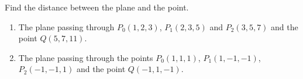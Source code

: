 Find the distance between the plane and the point.

\begin{enumerate}
\item The plane passing through $P_0(1,2,3) $, $P_1(2,3,5)$ and $P_2(3,5,7)$ and the point $Q(5,7,11)$.
\item The plane passing through the points $P_0(1,1,1)$, $P_1(1,-1,-1)$, $P_2(-1,-1,1)$ and the point $Q(-1,1,-1)$.
\end{enumerate}

\begin{comment}
Calculator code to solve above problem:

p0:=(1,2,3); 
p1:=(2,3,5);
p2:=(3,5,7);
q:=(2,-2,2);
u1:=p1-p0;
u2:=p2-p0;
u:=q-p0;
n:=u1\times u2;
((u n^t)_1)_1 /\sqrt{}(((n n^t)_1)_1) 
\end{comment}